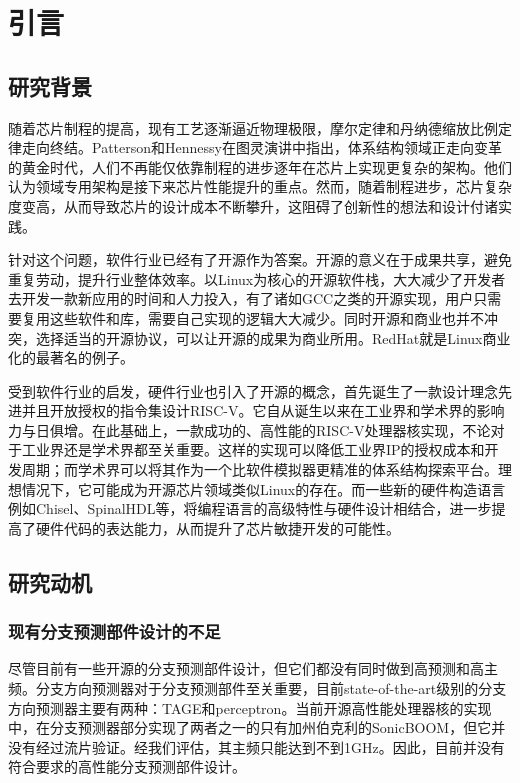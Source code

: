 \chapter{引言}\label{chap:intro}

\section{研究背景}

随着芯片制程的提高，现有工艺逐渐逼近物理极限，摩尔定律和丹纳德缩放比例定律走向终结。Patterson和Hennessy在图灵演讲中指出，体系结构领域正走向变革的黄金时代\cite{hennessy2019new}，人们不再能仅依靠制程的进步逐年在芯片上实现更复杂的架构。他们认为领域专用架构是接下来芯片性能提升的重点。然而，随着制程进步，芯片复杂度变高，从而导致芯片的设计成本不断攀升，这阻碍了创新性的想法和设计付诸实践。

针对这个问题，软件行业已经有了开源作为答案。开源的意义在于成果共享，避免重复劳动，提升行业整体效率。以Linux为核心的开源软件栈，大大减少了开发者去开发一款新应用的时间和人力投入，有了诸如GCC之类的开源实现，用户只需要复用这些软件和库，需要自己实现的逻辑大大减少。同时开源和商业也并不冲突，选择适当的开源协议，可以让开源的成果为商业所用。RedHat就是Linux商业化的最著名的例子。

受到软件行业的启发，硬件行业也引入了开源的概念，首先诞生了一款设计理念先进并且开放授权的指令集设计RISC-V\cite{asanovic2014instruction}。它自从诞生以来在工业界和学术界的影响力与日俱增。在此基础上，一款成功的、高性能的RISC-V处理器核实现，不论对于工业界还是学术界都至关重要。这样的实现可以降低工业界IP的授权成本和开发周期；而学术界可以将其作为一个比软件模拟器更精准的体系结构探索平台。理想情况下，它可能成为开源芯片领域类似Linux的存在。而一些新的硬件构造语言例如Chisel\cite{bachrach2012chisel}、SpinalHDL等，将编程语言的高级特性与硬件设计相结合，进一步提高了硬件代码的表达能力，从而提升了芯片敏捷开发的可能性。

\section{研究动机}
\subsection{现有分支预测部件设计的不足}
尽管目前有一些开源的分支预测部件设计，但它们都没有同时做到高预测和高主频。分支方向预测器对于分支预测部件至关重要，目前state-of-the-art级别的分支方向预测器主要有两种：TAGE\cite{seznec2006case}和perceptron\cite{jimenez2001dynamic}。当前开源高性能处理器核的实现中，在分支预测器部分实现了两者之一的只有加州伯克利的SonicBOOM\cite{zhao2020sonicboom}，但它并没有经过流片验证。经我们评估，其主频只能达到不到1GHz。因此，目前并没有符合要求的高性能分支预测部件设计。

